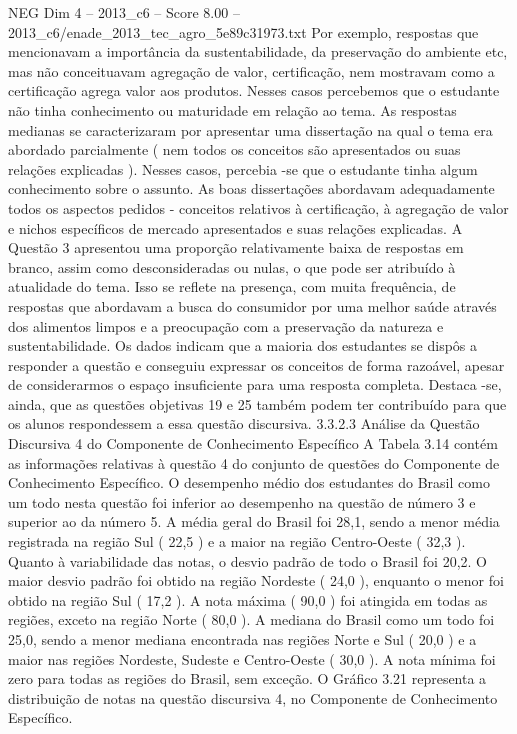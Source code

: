\begin{textsample}{NEG Dim 4 – 2013\_c6 – Score 8.00 – 2013\_c6/enade\_2013\_tec\_agro\_5e89c31973.txt}
Por exemplo, respostas que mencionavam a importância da sustentabilidade, da preservação do ambiente etc, mas não conceituavam agregação de valor, certificação, nem mostravam como a certificação agrega valor aos produtos.
Nesses casos percebemos que o estudante não tinha conhecimento ou maturidade em relação ao tema.
As respostas medianas se caracterizaram por apresentar uma dissertação na qual o tema era abordado parcialmente ( nem todos os conceitos são apresentados ou suas relações explicadas ).
Nesses casos, percebia -se que o estudante tinha algum conhecimento sobre o assunto.
As boas dissertações abordavam adequadamente todos os aspectos pedidos - conceitos relativos à certificação, à agregação de valor e nichos específicos de mercado apresentados e suas relações explicadas.
A Questão 3 apresentou uma proporção relativamente baixa de respostas em branco, assim como desconsideradas ou nulas, o que pode ser atribuído à atualidade do tema.
Isso se reflete na presença, com muita frequência, de respostas que abordavam a busca do consumidor por uma melhor saúde através dos alimentos limpos e a preocupação com a preservação da natureza e sustentabilidade.
Os dados indicam que a maioria dos estudantes se dispôs a responder a questão e conseguiu expressar os conceitos de forma razoável, apesar de considerarmos o espaço insuficiente para uma resposta completa.
Destaca -se, ainda, que as questões objetivas 19 e 25 também podem ter contribuído para que os alunos respondessem a essa questão discursiva. 3.3.2.3 Análise da Questão Discursiva 4 do Componente de Conhecimento Específico A Tabela 3.14 contém as informações relativas à questão 4 do conjunto de questões do Componente de Conhecimento Específico.
O desempenho médio dos estudantes do Brasil como um todo nesta questão foi inferior ao desempenho na questão de número 3 e superior ao da número 5.
A média geral do Brasil foi 28,1, sendo a menor média registrada na região Sul ( 22,5 ) e a maior na região Centro-Oeste ( 32,3 ).
Quanto à variabilidade das notas, o desvio padrão de todo o Brasil foi 20,2.
O maior desvio padrão foi obtido na região Nordeste ( 24,0 ), enquanto o menor foi obtido na região Sul ( 17,2 ).
A nota máxima ( 90,0 ) foi atingida em todas as regiões, exceto na região Norte ( 80,0 ).
A mediana do Brasil como um todo foi 25,0, sendo a menor mediana encontrada nas regiões Norte e Sul ( 20,0 ) e a maior nas regiões Nordeste, Sudeste e Centro-Oeste ( 30,0 ).
A nota mínima foi zero para todas as regiões do Brasil, sem exceção.
O Gráfico 3.21 representa a distribuição de notas na questão discursiva 4, no Componente de Conhecimento Específico.

\end{textsample}
